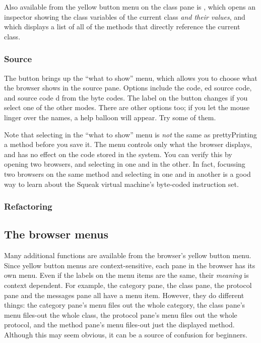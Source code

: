 \documentclass[a4paper,10pt,twoside]{book}
\begin{document}
Also available from the yellow button menu on the class pane is , which opens an inspector showing the class variables of the current class \emph{and their values}, and  which displays a list of all of the methods that directly reference the current class.

\subsubsection{Source}
\label{sec:sources}

The  button brings up the ``what to show'' menu, which allows you to choose what the browser shows in the source pane.  Options include the  code, ed source code,  and source code d from the byte codes.  The label on the button changes if you select one of the other modes.  There are other options too; if you let the mouse linger over the names, a help balloon will appear.  Try some of them.

Note that selecting  in the ``what to show'' menu is \emph{not} the same as prettyPrinting a method before you save it.  
The menu controls only what the browser displays, and has no effect on the code stored in the system.  
You can verify this  by opening two browsers, and selecting  in one and  in the other.   
In fact, focussing two browsers on the same method and selecting  in one and  in another is a good way to learn about the Squeak virtual machine's byte-coded instruction set.

\subsubsection{Refactoring}

\subsection{The browser menus}

Many additional functions are available from the browser's yellow button menu.  
Since yellow button menus are context-sensitive,  each pane in the browser has its own menu.  
Even if the labels on the menu items are the same, their \emph{meaning} is context dependent.  
For example, the category pane, the class pane, the protocol pane and the messages pane all have a  menu item.  However, they do different things: the category pane's  menu files out the whole category, the class pane's  menu files-out the whole class, the protocol pane's  menu files out the whole protocol, and the method pane's  menu files-out just the displayed method.
Although this may seem obvious, it can be a source of confusion for beginners. 
\end{document}
